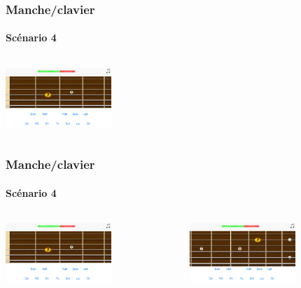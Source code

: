 \documentclass{beamer}
\begin{document}


	\begin{frame}

   		\frametitle{Manche/clavier}

       		\framesubtitle{Scénario 4}

		\begin{columns}

			 \begin{column}{0.4\textwidth}

				\includegraphics[width=4cm]{images/clavier_question.png}

			\end{column}

			 \begin{column}{0.4\textwidth}

				
			\end{column}

		\end{columns} 

	\end{frame}

	\begin{frame}

   		\frametitle{Manche/clavier}

       		\framesubtitle{Scénario 4}

		\begin{columns}

			 \begin{column}{0.4\textwidth}

				\includegraphics[width=4cm]{images/clavier_question.png}

			\end{column}

			 \begin{column}{0.4\textwidth}

				\includegraphics[width=4cm]{images/clavier_question_manche_decale.png}

				
			\end{column}


		\end{columns} 

	\end{frame}
\end{document}
